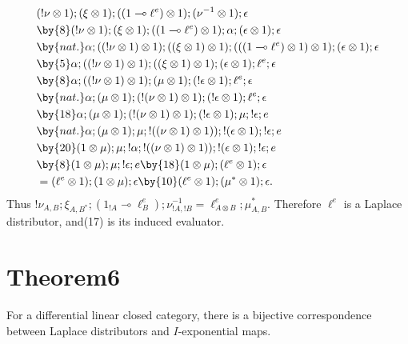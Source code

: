 \begin{align*}
&(!\nu\otimes1);(\xi\otimes1);((1\multimap\ell^e)\otimes1);(\nu^{-1}\otimes1);\epsilon\\
&\by{8}(!\nu\otimes1);(\xi\otimes1);((1\multimap\ell^e)\otimes1);\alpha;(\epsilon\otimes1);\epsilon\\
&\by{nat.}\alpha;((!\nu\otimes1)\otimes1);((\xi\otimes1)\otimes1);
(((1\multimap\ell^e)\otimes1)\otimes1);(\epsilon\otimes1);\epsilon\\
&\by{5}\alpha;((!\nu\otimes1)\otimes1);((\xi\otimes1)\otimes1);(\epsilon\otimes1);\ell^e;\epsilon\\
&\by{8}\alpha;((!\nu\otimes1)\otimes1);(\mu\otimes1);(!\epsilon\otimes1);\ell^e;\epsilon\\
&\by{nat.}\alpha;(\mu\otimes1);(!(\nu\otimes1)\otimes1);(!\epsilon\otimes1);\ell^e;\epsilon\\
&\by{18}\alpha;(\mu\otimes1);(!(\nu\otimes1)\otimes1);(!\epsilon\otimes1);\mu;!\epsilon;e\\
&\by{nat.}\alpha;(\mu\otimes1);\mu;!((\nu\otimes1)\otimes1));!(\epsilon\otimes1);!\epsilon;e\\
&\by{20}(1\otimes\mu);\mu;!\alpha;!((\nu\otimes1)\otimes1));!(\epsilon\otimes1);!\epsilon;e\\
&\by{8}(1\otimes\mu);\mu;!\epsilon;e
\by{18}(1\otimes\mu);(\ell^e\otimes1);\epsilon\\
&=(\ell^e\otimes1);(1\otimes\mu);\epsilon
\by{10}(\ell^e\otimes1);(\mu^*\otimes1);\epsilon.
\end{align*}
Thus $!\nu_{A,B};\xi_{A,B^*};(1_{!A}\multimap\ell_B^e);\nu_{!A,!B}^{-1}
=\ell_{A\otimes B}^e;\mu_{A,B}^*$.
Therefore $\ell^e$ is a Laplace distributor, and(17) is its induced evaluator.

\section*{Theorem6}
For a differential linear closed category, there is a bijective correspondence
between Laplace distributors and $I$-exponential maps.


